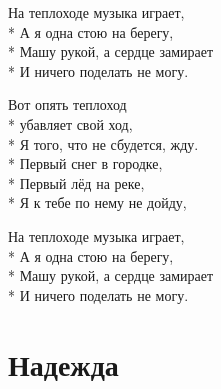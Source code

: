\medskip

\begin{minipage}{\linewidth}
\hspace*{1.5em}На теплоходе музыка играет,\\*
\hspace*{1.5em}А я одна стою на берегу,\\*
\hspace*{1.5em}Машу рукой, а сердце замирает\\*
\hspace*{1.5em}И ничего поделать не могу.\\
\end{minipage}\par\medskip\nobreak

\medskip

\begin{minipage}{\linewidth}
Вот опять теплоход\\*
убавляет свой ход,\\*
Я того, что не сбудется, жду.\\*
Первый снег в городке,\\*
Первый лёд на реке,\\*
Я к тебе по нему не дойду,\\
\end{minipage}\par\medskip\nobreak

\medskip

\begin{minipage}{\linewidth}
\hspace*{1.5em}На теплоходе музыка играет,\\*
\hspace*{1.5em}А я одна стою на берегу,\\*
\hspace*{1.5em}Машу рукой, а сердце замирает\\*
\hspace*{1.5em}И ничего поделать не могу.\\
\end{minipage}

\vspace{\fill}\newpage

\section{Надежда}
\label{song:Надежда}

